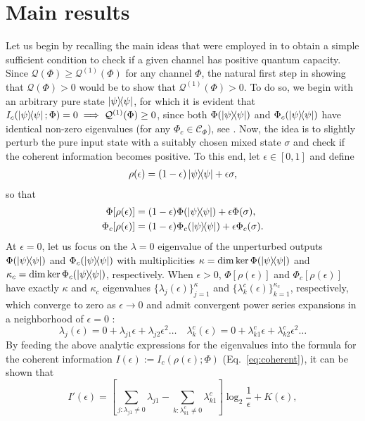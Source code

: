 \documentclass[a4paper,onecolumn,10pt,accepted=2022-07-11]{quantumarticle}
\theoremstyle{definition}
\begin{document}
\section{Main results}\label{sec:main}
Let us begin by recalling the main ideas that were employed in \cite{siddhu2020logsingularities, Singh2022detecting} to obtain a simple sufficient condition to check if a given channel has positive quantum capacity. Since $\mathcal{Q}(\Phi)\geq \mathcal{Q}^{(1)}(\Phi)$ for any channel $\Phi$, the natural first step in showing that $\mathcal{Q}(\Phi)>0$ would be to show that $\mathcal{Q}^{(1)}(\Phi)>0$. To do so, we begin with an arbitrary pure state $\ketbra{\psi}$, for which it is evident
that $I_c(\ketbra{\psi};\Phi)=0\implies \mathcal{Q}^{(1)}(\Phi)\geq 0$, since both $\Phi(\ketbra{\psi})$ and $\Phi_c(\ketbra{\psi})$ have identical non-zero eigenvalues (for any $\Phi_c\in \mathcal{C}_\Phi$), see \cite[Theorem 3]{King2007complement}. Now, the idea is to slightly perturb the pure input state with a suitably chosen mixed state $\sigma$ and check if the coherent information becomes positive. To this end, let $\epsilon\in [0,1]$ and define
\begin{align}
    \rho(\epsilon) = (1-\epsilon)\ketbra{\psi} + \epsilon \sigma,
\end{align}
so that 
\begin{align}
    \Phi[\rho(\epsilon)] &= (1-\epsilon)\Phi(\ketbra{\psi}) + \epsilon \Phi(\sigma), \nonumber \\
    \Phi_c[\rho(\epsilon)] &= (1-\epsilon)\Phi_c(\ketbra{\psi}) + \epsilon \Phi_c(\sigma).
\end{align}
At $\epsilon=0$, let us focus on the $\lambda=0$ eigenvalue of the unperturbed outputs $\Phi(\ketbra{\psi}{\psi})$ and $\Phi_c(\ketbra{\psi}{\psi})$ with multiplicities $\kappa=\dim \ker\Phi(\ketbra{\psi})$ and $ \kappa_c=\dim\ker\Phi_c(\ketbra{\psi})$, respectively. When $\epsilon>0$, $\Phi[\rho(\epsilon)]$ and $\Phi_c[\rho(\epsilon)]$ have exactly $\kappa$ and $\kappa_c$ eigenvalues $\{\lambda_j (\epsilon)\}_{j=1}^\kappa$ and $\{\lambda^c_k (\epsilon)\}_{k=1}^{\kappa_c}$, respectively, which converge to zero as $\epsilon\to 0$ and admit convergent power series expansions in a neighborhood of $\epsilon=0$ \cite[Chapter 1]{rellich1969perturbation}:
\begin{equation*}
\lambda_j (\epsilon) = 0+ \lambda_{j1}\epsilon + \lambda_{j2}\epsilon^2\ldots \quad \lambda^c_k (\epsilon) = 0+ \lambda^c_{k1}\epsilon +\lambda^c_{k2}\epsilon^2\ldots
\end{equation*}
By feeding the above analytic expressions for the eigenvalues into the formula for the coherent information $I(\epsilon):=I_c(\rho(\epsilon);\Phi)$ (Eq.~\eqref{eq:coherent}), it can be shown that
\begin{equation}
    I'(\epsilon) = \left[ \sum_{j:\lambda_{j1}\neq 0} \lambda_{j1} - \sum_{k : \lambda^c_{k1}\neq 0} \lambda^c_{k1} \right] \log_2 \frac{1}{\epsilon} + K(\epsilon),
\end{equation}
\end{document}

